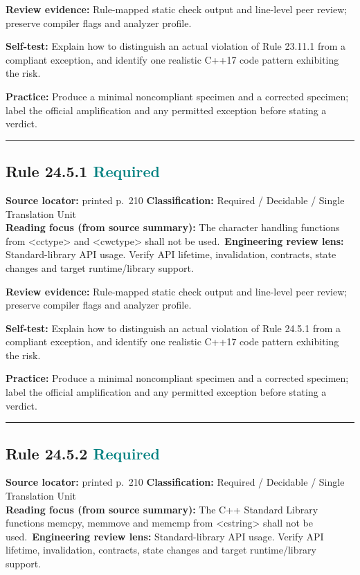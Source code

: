 \documentclass[10pt,letterpaper]{article}
\begin{document}
\textbf{Review evidence:} Rule-mapped static check output and line-level peer review; preserve compiler flags and analyzer profile.

\textbf{Self-test:} Explain how to distinguish an actual violation of Rule 23.11.1 from a compliant exception, and identify one realistic C++17 code pattern exhibiting the risk.\par
\textbf{Practice:} Produce a minimal noncompliant specimen and a corrected specimen; label the official amplification and any permitted exception before stating a verdict.
\smallskip\hrule\smallskip
\subsection*{Rule 24.5.1 \enspace \texorpdfstring{\small\textcolor{teal}{Required}}{Required}}
\noindent\textbf{Source locator:} printed p.~210 \quad\textbf{Classification:} Required / Decidable / Single Translation Unit\\
\textbf{Reading focus (from source summary):} The character handling functions from \textless{}cctype\textgreater{} and \textless{}cwctype\textgreater{} shall not be used.\
\textbf{Engineering review lens:} Standard-library API usage. Verify API lifetime, invalidation, contracts, state changes and target runtime/library support.

\textbf{Review evidence:} Rule-mapped static check output and line-level peer review; preserve compiler flags and analyzer profile.

\textbf{Self-test:} Explain how to distinguish an actual violation of Rule 24.5.1 from a compliant exception, and identify one realistic C++17 code pattern exhibiting the risk.\par
\textbf{Practice:} Produce a minimal noncompliant specimen and a corrected specimen; label the official amplification and any permitted exception before stating a verdict.
\smallskip\hrule\smallskip
\subsection*{Rule 24.5.2 \enspace \texorpdfstring{\small\textcolor{teal}{Required}}{Required}}
\noindent\textbf{Source locator:} printed p.~210 \quad\textbf{Classification:} Required / Decidable / Single Translation Unit\\
\textbf{Reading focus (from source summary):} The C++ Standard Library functions memcpy, memmove and memcmp from \textless{}cstring\textgreater{} shall not be used.\
\textbf{Engineering review lens:} Standard-library API usage. Verify API lifetime, invalidation, contracts, state changes and target runtime/library support.
\end{document}
